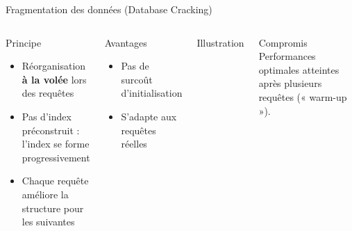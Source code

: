 \documentclass[a4paper,12pt]{beamer}
\begin{document}
\begin{frame}{Fragmentation des données (Database Cracking)}
    \begin{columns}[T]
        \begin{block}{Principe}
            \footnotesize
            \begin{itemize}
                \item Réorganisation \textbf{à la volée} lors des requêtes
                \item Pas d'index préconstruit : l'index se forme progressivement
                \item Chaque requête améliore la structure pour les suivantes
            \end{itemize}
        \end{block}
        \vspace{0.2cm}
        \begin{exampleblock}{Avantages}
            \footnotesize
            \begin{itemize}
                \item Pas de surcoût d'initialisation
                \item S'adapte aux requêtes réelles
            \end{itemize}
        \end{exampleblock}

        \begin{block}{Illustration}
            \centering\footnotesize
        \end{block}
        \vspace{0.15cm}
        \begin{alertblock}{Compromis}
            \footnotesize
            Performances optimales atteintes après plusieurs requêtes (« warm-up »).
        \end{alertblock}
    \end{columns}
\end{frame}
\end{document}
